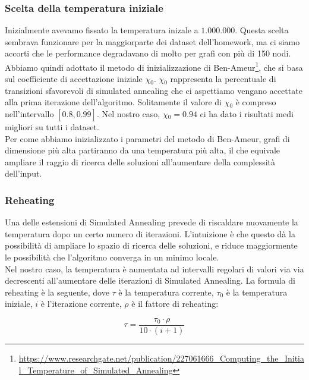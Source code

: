 \subsubsection{Scelta della temperatura iniziale}

Inizialmente avevamo fissato la temperatura inizale a $1.000.000$. Questa scelta sembrava funzionare per la maggiorparte dei dataset dell'homework, ma ci siamo accorti che le performance degradavano di molto per grafi con più di 150 nodi. \\

\noindent Abbiamo quindi adottato il metodo di inizializzazione di Ben-Ameur\footnote{\url{https://www.researchgate.net/publication/227061666_Computing_the_Initial_Temperature_of_Simulated_Annealing}}, che si basa sul coefficiente di accettazione iniziale $\chi{}_0$. $\chi{}_0$ rappresenta la percentuale di transizioni sfavorevoli di simulated annealing che ci aspettiamo vengano accettate alla prima iterazione dell'algoritmo. Solitamente il valore di $\chi{}_0$ è compreso nell'intervallo $[0.8, 0.\overline{99}]$. Nel nostro caso, $\chi{}_0 = 0.94$ ci ha dato i risultati medi migliori su tutti i dataset. \\

\noindent Per come abbiamo inizializzato i parametri del metodo di Ben-Ameur, grafi di dimensione più alta partiranno da una temperatura più alta, il che equivale ampliare il raggio di ricerca delle soluzioni all'aumentare della complessità dell'input.

\subsubsection{Reheating}

Una delle estensioni di Simulated Annealing prevede di riscaldare nuovamente la temperatura dopo un certo numero di iterazioni. L'intuizione è che questo dà la possibilità di ampliare lo spazio di ricerca delle soluzioni, e riduce maggiormente le possibilità che l'algoritmo converga in un minimo locale. \\

\noindent Nel nostro caso, la temperatura è aumentata ad intervalli regolari di valori via via decrescenti all'aumentare delle iterazioni di Simulated Annealing. La formula di reheating è la seguente, dove $\tau{}$ è la temperatura corrente, $\tau{}_0$ è la temperatura iniziale, $i$ è l'iterazione corrente, $\rho$ è il fattore di reheating:

\begin{equation}
    \tau{} = \frac{\tau{}_0 \cdot \rho{}}{10 \cdot (i + 1)}
\end{equation}

